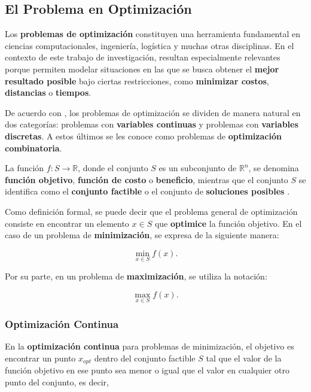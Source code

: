 \documentclass[12pt,titlepage,twoside,openright]{book}
\begin{document}
\subsection{El Problema en Optimización}

Los \textbf{problemas de optimización} constituyen una herramienta fundamental en ciencias computacionales, ingeniería, logística y muchas otras disciplinas. En el contexto de este trabajo de investigación, resultan especialmente relevantes porque permiten modelar situaciones en las que se busca obtener el \textbf{mejor resultado posible} bajo ciertas restricciones, como \textbf{minimizar costos}, \textbf{distancias} o \textbf{tiempos}.

De acuerdo con \citep{cobos2010}, los problemas de optimización se dividen de manera natural en dos categorías: problemas con \textbf{variables continuas} y problemas con \textbf{variables discretas}. A estos últimos se les conoce como problemas de \textbf{optimización combinatoria}.

La función \(f : S \to \mathbb{R}\), donde el conjunto \(S\) es un subconjunto de \(\mathbb{R}^n\), se denomina \textbf{función objetivo}, \textbf{función de costo} o \textbf{beneficio}, mientras que el conjunto \(S\) se identifica como el \textbf{conjunto factible} o el conjunto de \textbf{soluciones posibles} \citep{cobos2010}.

Como definición formal, se puede decir que el problema general de optimización consiste en encontrar un elemento \(x \in S\) que \textbf{optimice} la función objetivo. En el caso de un problema de \textbf{minimización}, se expresa de la siguiente manera:

\[
	\min_{x \in S} f(x).
\]

Por su parte, en un problema de \textbf{maximización}, se utiliza la notación:

\[
	\max_{x \in S} f(x).
\]

\citep{cobos2010}



\subsubsection{Optimización Continua}

En la \textbf{optimización continua} para problemas de minimización, el objetivo es encontrar un punto \( x_{opt} \) dentro del conjunto factible \( S \) tal que el valor de la función objetivo en ese punto sea menor o igual que el valor en cualquier otro punto del conjunto, es decir,
\end{document}
